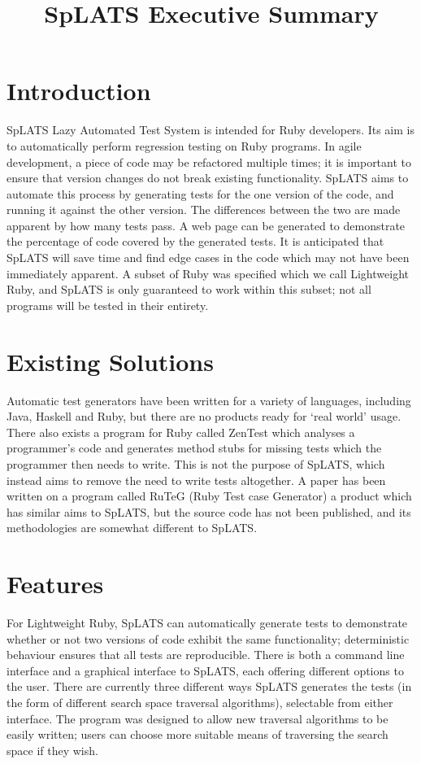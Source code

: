 \documentclass{article}
\title{SpLATS Executive Summary}
\begin{document}
\maketitle

\section{Introduction}

SpLATS Lazy Automated Test System is intended for Ruby developers. Its aim is to automatically perform regression testing on Ruby programs. 
In agile development, a piece of code may be refactored multiple times; it is important to ensure that version changes do not break existing functionality. SpLATS aims to automate this process by generating tests for the one version of the code, and running it against the other version. The differences between the two are made apparent by how many tests pass. A web page can be generated to demonstrate the percentage of code covered by the generated tests.
It is anticipated that SpLATS will save time and find edge cases in the code which may not have been immediately apparent.
A subset of Ruby was specified which we call Lightweight Ruby, and SpLATS is only guaranteed to work within this subset; not all programs will be tested in their entirety.

\section{Existing Solutions}
Automatic test generators have been written for a variety of languages, including Java, Haskell and Ruby, but there are no products ready for ‘real world’ usage. 
There also exists a program for Ruby called ZenTest which analyses a programmer’s code and generates method stubs for missing tests which the programmer then needs to write. This is not the purpose of SpLATS, which instead aims to remove the need to write tests altogether. 
A paper has been written on a program called RuTeG (Ruby Test case Generator) a product which has similar aims to SpLATS, but the source code has not been published, and its methodologies are somewhat different to SpLATS.

\section{Features}
For Lightweight Ruby, SpLATS can automatically generate tests to demonstrate whether or not two versions of code exhibit the same functionality; deterministic behaviour ensures that all tests are reproducible. There is both a command line interface and a graphical interface to SpLATS, each offering different options to the user. 
There are currently three different ways SpLATS generates the tests (in the form of different search space traversal algorithms), selectable from either interface. The program was designed to allow new traversal algorithms to be easily written; users can choose more suitable means of traversing the search space if they wish.
\end{document}
